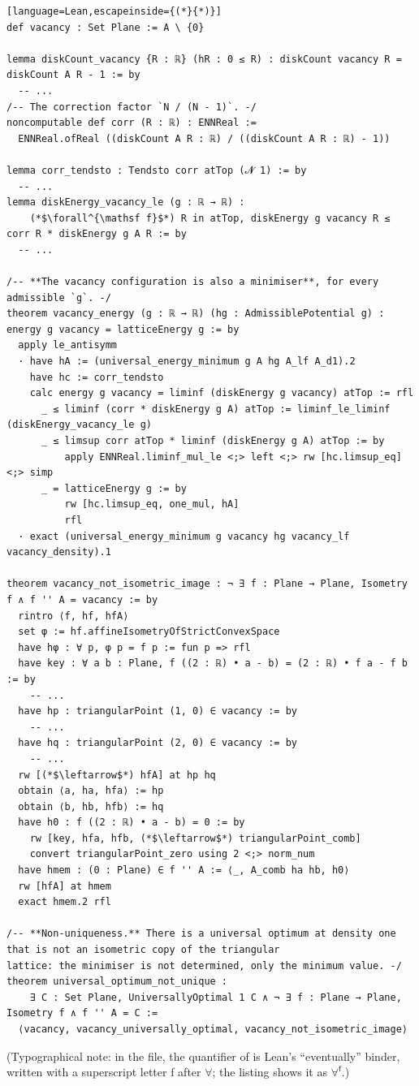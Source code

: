 \begin{leanbox}
\begin{lstlisting}[language=Lean,escapeinside={(*}{*)}]
def vacancy : Set Plane := A \ {0}

lemma diskCount_vacancy {R : ℝ} (hR : 0 ≤ R) : diskCount vacancy R = diskCount A R - 1 := by
  -- ...
/-- The correction factor `N / (N - 1)`. -/
noncomputable def corr (R : ℝ) : ENNReal :=
  ENNReal.ofReal ((diskCount A R : ℝ) / ((diskCount A R : ℝ) - 1))

lemma corr_tendsto : Tendsto corr atTop (𝓝 1) := by
  -- ...
lemma diskEnergy_vacancy_le (g : ℝ → ℝ) :
    (*$\forall^{\mathsf f}$*) R in atTop, diskEnergy g vacancy R ≤ corr R * diskEnergy g A R := by
  -- ...

/-- **The vacancy configuration is also a minimiser**, for every admissible `g`. -/
theorem vacancy_energy (g : ℝ → ℝ) (hg : AdmissiblePotential g) : energy g vacancy = latticeEnergy g := by
  apply le_antisymm
  · have hA := (universal_energy_minimum g A hg A_lf A_d1).2
    have hc := corr_tendsto
    calc energy g vacancy = liminf (diskEnergy g vacancy) atTop := rfl
      _ ≤ liminf (corr * diskEnergy g A) atTop := liminf_le_liminf (diskEnergy_vacancy_le g)
      _ ≤ limsup corr atTop * liminf (diskEnergy g A) atTop := by
          apply ENNReal.liminf_mul_le <;> left <;> rw [hc.limsup_eq] <;> simp
      _ = latticeEnergy g := by
          rw [hc.limsup_eq, one_mul, hA]
          rfl
  · exact (universal_energy_minimum g vacancy hg vacancy_lf vacancy_density).1

theorem vacancy_not_isometric_image : ¬ ∃ f : Plane → Plane, Isometry f ∧ f '' A = vacancy := by
  rintro ⟨f, hf, hfA⟩
  set φ := hf.affineIsometryOfStrictConvexSpace
  have hφ : ∀ p, φ p = f p := fun p => rfl
  have key : ∀ a b : Plane, f ((2 : ℝ) • a - b) = (2 : ℝ) • f a - f b := by
    -- ...
  have hp : triangularPoint (1, 0) ∈ vacancy := by
    -- ...
  have hq : triangularPoint (2, 0) ∈ vacancy := by
    -- ...
  rw [(*$\leftarrow$*) hfA] at hp hq
  obtain ⟨a, ha, hfa⟩ := hp
  obtain ⟨b, hb, hfb⟩ := hq
  have h0 : f ((2 : ℝ) • a - b) = 0 := by
    rw [key, hfa, hfb, (*$\leftarrow$*) triangularPoint_comb]
    convert triangularPoint_zero using 2 <;> norm_num
  have hmem : (0 : Plane) ∈ f '' A := ⟨_, A_comb ha hb, h0⟩
  rw [hfA] at hmem
  exact hmem.2 rfl

/-- **Non-uniqueness.** There is a universal optimum at density one that is not an isometric copy of the triangular
lattice: the minimiser is not determined, only the minimum value. -/
theorem universal_optimum_not_unique :
    ∃ C : Set Plane, UniversallyOptimal 1 C ∧ ¬ ∃ f : Plane → Plane, Isometry f ∧ f '' A = C :=
  ⟨vacancy, vacancy_universally_optimal, vacancy_not_isometric_image⟩
\end{lstlisting}
(Typographical note: in the file, the quantifier of  is Lean's ``eventually'' binder, written
with a superscript letter f after $\forall$; the listing shows it as $\forall^{\mathsf f}$.)
\end{leanbox}

